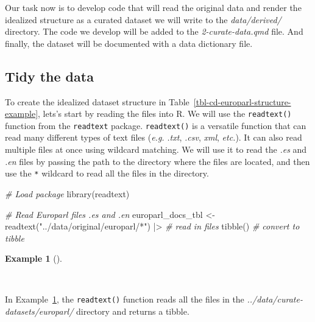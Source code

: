 \documentclass[
  letterpaper,
  DIV=11,
  numbers=noendperiod]{scrreport}
\newenvironment{Shaded}{\begin{snugshade}}{\end{snugshade}}
\newcommand{\CommentTok}[1]{\textcolor[rgb]{0.00,0.00,0.00}{\textit{#1}}}
\newcommand{\FunctionTok}[1]{\textcolor[rgb]{0.00,0.00,0.00}{#1}}
\newcommand{\NormalTok}[1]{\textcolor[rgb]{0.00,0.00,0.00}{#1}}
\newcommand{\OtherTok}[1]{\textcolor[rgb]{0.00,0.00,0.00}{#1}}
\newcommand{\SpecialCharTok}[1]{\textcolor[rgb]{0.00,0.00,0.00}{#1}}
\newcommand{\StringTok}[1]{\textcolor[rgb]{0.00,0.00,0.00}{#1}}
\theoremstyle{definition}
\newtheorem{example}{Example}[chapter]
\theoremstyle{remark}
\begin{document}
Our task now is to develop code that will read the original data and
render the idealized structure as a curated dataset we will write to the
\emph{data/derived/} directory. The code we develop will be added to the
\emph{2-curate-data.qmd} file. And finally, the dataset will be
documented with a data dictionary file.

\hypertarget{tidy-the-data}{%
\subsection{Tidy the data}\label{tidy-the-data}}

To create the idealized dataset structure in
Table~\ref{tbl-cd-europarl-structure-example}, lets's start by reading
the files into R. We will use the \texttt{readtext()} function from the
\texttt{readtext} package. \texttt{readtext()} is a versatile function
that can read many different types of text files (\emph{e.g.}
\emph{.txt}, \emph{.csv}, \emph{xml}, \emph{etc.}). It can also read
multiple files at once using wildcard matching. We will use it to read
the \emph{.es} and \emph{.en} files by passing the path to the directory
where the files are located, and then use the \texttt{*} wildcard to
read all the files in the directory.

\begin{Shaded}
\begin{Highlighting}[]
\CommentTok{\# Load package}
\FunctionTok{library}\NormalTok{(readtext)}

\CommentTok{\# Read Europarl files .es and .en}
\NormalTok{europarl\_docs\_tbl }\OtherTok{\textless{}{-}}
  \FunctionTok{readtext}\NormalTok{(}\StringTok{"../data/original/europarl/*"}\NormalTok{) }\SpecialCharTok{|\textgreater{}} \CommentTok{\# read in files}
  \FunctionTok{tibble}\NormalTok{() }\CommentTok{\# convert to tibble}
\end{Highlighting}
\end{Shaded}

\begin{example}[]\protect\hypertarget{exm-cd-europarl-readtext}{}\label{exm-cd-europarl-readtext}

~

\end{example}

In Example~\ref{exm-cd-europarl-readtext}, the \texttt{readtext()}
function reads all the files in the
\emph{../data/curate-datasets/europarl/} directory and returns a tibble.
\end{document}
